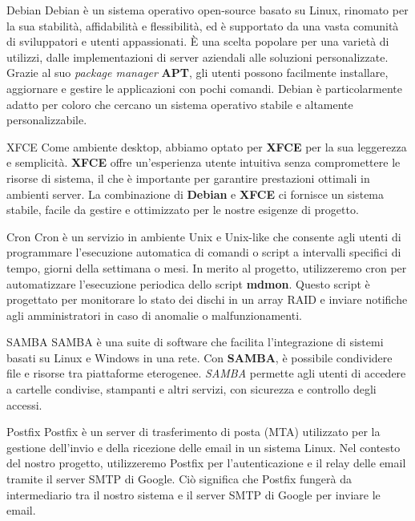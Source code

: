 \documentclass{beamer}
\begin{document}
\begin{frame}{Debian}
    Debian è un sistema operativo open-source basato su Linux, rinomato per la sua stabilità, affidabilità e flessibilità, ed è supportato da una vasta comunità di sviluppatori e utenti appassionati. È una scelta popolare per una varietà di utilizzi, dalle implementazioni di server aziendali alle soluzioni personalizzate. Grazie al suo \textit{package manager} \textbf{APT}, gli utenti possono facilmente installare, aggiornare e gestire le applicazioni con pochi comandi. Debian è particolarmente adatto per coloro che cercano un sistema operativo stabile e altamente personalizzabile.
\end{frame}

\begin{frame}{XFCE}
    Come ambiente desktop, abbiamo optato per \textbf{XFCE} per la sua leggerezza e semplicità. \textbf{XFCE} offre un'esperienza utente intuitiva senza compromettere le risorse di sistema, il che è importante per garantire prestazioni ottimali in ambienti server. La combinazione di \textbf{Debian} e \textbf{XFCE} ci fornisce un sistema stabile, facile da gestire e ottimizzato per le nostre esigenze di progetto.
\end{frame}

\begin{frame}{Cron}
    Cron è un servizio in ambiente Unix e Unix-like che consente agli utenti di programmare l'esecuzione automatica di comandi o script a intervalli specifici di tempo, giorni della settimana o mesi. In merito al progetto, utilizzeremo cron per automatizzare l'esecuzione periodica dello script \textbf{mdmon}. Questo script è progettato per monitorare lo stato dei dischi in un array RAID e inviare notifiche agli amministratori in caso di anomalie o malfunzionamenti.
\end{frame}

\begin{frame}{SAMBA}
    SAMBA è una suite di software che facilita l'integrazione di sistemi basati su Linux e Windows in una rete. Con \textbf{SAMBA}, è possibile condividere file e risorse tra piattaforme eterogenee. \textit{SAMBA} permette agli utenti di accedere a cartelle condivise, stampanti e altri servizi, con sicurezza e controllo degli accessi.
\end{frame}

\begin{frame}{Postfix}
    Postfix è un server di trasferimento di posta (MTA) utilizzato per la gestione dell'invio e della ricezione delle email in un sistema Linux. Nel contesto del nostro progetto, utilizzeremo Postfix per l'autenticazione e il relay delle email tramite il server SMTP di Google. Ciò significa che Postfix fungerà da intermediario tra il nostro sistema e il server SMTP di Google per inviare le email.
\end{frame}
\end{document}
